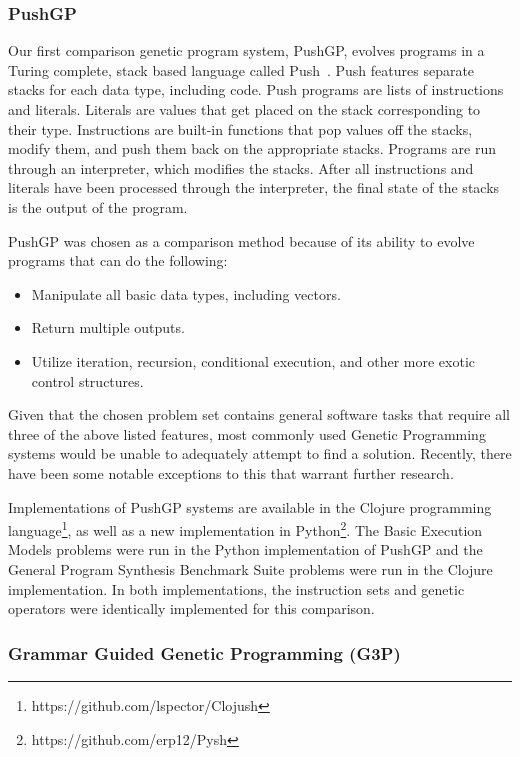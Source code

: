 \subsubsection{PushGP}

Our first comparison genetic program system, PushGP, evolves programs in a Turing complete, stack based language called Push~\cite{Spector2002, Spector2005}. Push features separate stacks for each data type, including code. Push programs are lists of instructions and literals. Literals are values that get placed on the stack corresponding to their type. Instructions are built-in functions that pop values off the stacks, modify them, and push them back on the appropriate stacks. Programs are run through an interpreter, which modifies the stacks. After all instructions and literals have been processed through the interpreter, the final state of the stacks is the output of the program.

PushGP was chosen as a comparison method because of its ability to evolve programs that can do the following:
\begin{itemize}
\item Manipulate all basic data types, including vectors.
\item Return multiple outputs.
\item Utilize iteration, recursion, conditional execution, and other more exotic control structures.
\end{itemize}

Given that the chosen problem set contains general software tasks that require all three of the above listed features, most commonly used Genetic Programming systems would be unable to adequately attempt to find a solution. Recently, there have been some notable exceptions to this that warrant further research.

Implementations of PushGP systems are available in the Clojure programming language\footnote{https://github.com/lspector/Clojush}, as well as a new implementation in Python\footnote{https://github.com/erp12/Pysh}. The Basic Execution Models problems were run in the Python implementation of PushGP and the General Program Synthesis Benchmark Suite problems were run in the Clojure implementation. In both implementations, the instruction sets and genetic operators were identically implemented for this comparison.

\subsubsection{Grammar Guided Genetic Programming (G3P)}

